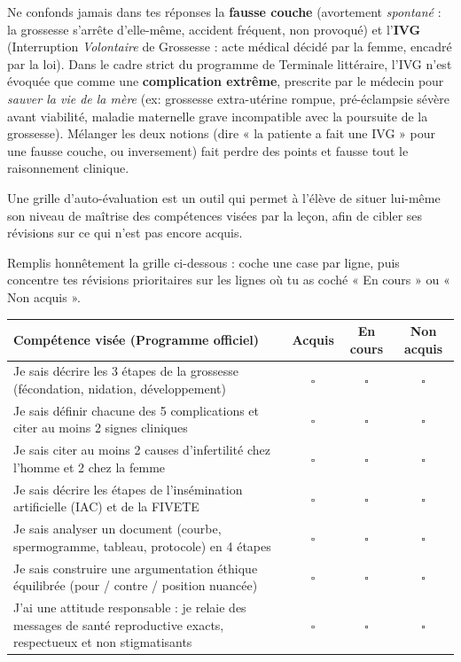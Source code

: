 \documentclass[11pt]{article}
\newcommand{\cle}[1]{{\popxbold\color{popdark}#1}}
\newcounter{popsec}
\newcounter{popsub}
\newcommand{\courssub}[1]{%
  \stepcounter{popsub}%
  \par\vspace{9pt}\noindent{\popxbold\fontsize{11.5}{13}\selectfont\color{popink}{\color{poporange}\thepopsec.\thepopsub}\hspace{6pt}#1}\par\nopagebreak\vspace{4pt}
}
\begin{document}
\begin{attention}
Ne confonds jamais dans tes réponses la \textbf{fausse couche} (avortement \emph{spontané} : la grossesse s'arrête d'elle-même, accident fréquent, non provoqué) et l'\textbf{IVG} (Interruption \emph{Volontaire} de Grossesse : acte médical décidé par la femme, encadré par la loi). Dans le cadre strict du programme de Terminale littéraire, l'IVG n'est évoquée que comme une \textbf{complication extrême}, prescrite par le médecin pour \emph{sauver la vie de la mère} (ex: grossesse extra-utérine rompue, pré-éclampsie sévère avant viabilité, maladie maternelle grave incompatible avec la poursuite de la grossesse). Mélanger les deux notions (dire « la patiente a fait une IVG » pour une fausse couche, ou inversement) fait perdre des points et fausse tout le raisonnement clinique.
\end{attention}

\courssub{Auto-évaluation : situer sa maîtrise}

\begin{definition}
Une \cle{grille d'auto-évaluation} est un outil qui permet à l'élève de situer lui-même son niveau de maîtrise des compétences visées par la leçon, afin de cibler ses révisions sur ce qui n'est pas encore acquis.
\end{definition}

Remplis honnêtement la grille ci-dessous : coche une case par ligne, puis concentre tes révisions prioritaires sur les lignes où tu as coché « En cours » ou « Non acquis ».

\begin{center}
\begin{tabularx}{\linewidth}{|X|c|c|c|}
\hline
\rowcolor{popblueL} \textbf{Compétence visée (Programme officiel)} & \textbf{Acquis} & \textbf{En cours} & \textbf{Non acquis} \\
\hline
Je sais décrire les 3 étapes de la grossesse (fécondation, nidation, développement) & $\square$ & $\square$ & $\square$ \\
\hline
Je sais définir chacune des 5 complications et citer au moins 2 signes cliniques & $\square$ & $\square$ & $\square$ \\
\hline
Je sais citer au moins 2 causes d'infertilité chez l'homme et 2 chez la femme & $\square$ & $\square$ & $\square$ \\
\hline
Je sais décrire les étapes de l'insémination artificielle (IAC) et de la FIVETE & $\square$ & $\square$ & $\square$ \\
\hline
Je sais analyser un document (courbe, spermogramme, tableau, protocole) en 4 étapes & $\square$ & $\square$ & $\square$ \\
\hline
Je sais construire une argumentation éthique équilibrée (pour / contre / position nuancée) & $\square$ & $\square$ & $\square$ \\
\hline
J'ai une attitude responsable : je relaie des messages de santé reproductive exacts, respectueux et non stigmatisants & $\square$ & $\square$ & $\square$ \\
\hline
\end{tabularx}
\end{center}
\end{document}
